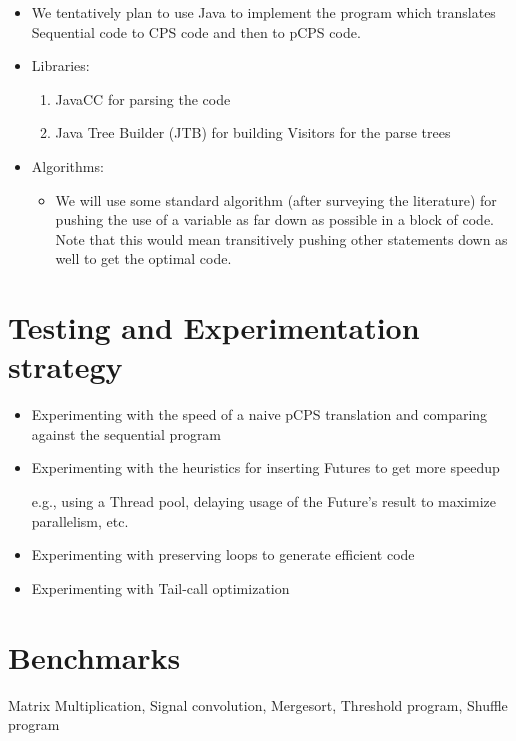 \documentclass[10pt]{article}
\begin{document}
\begin{itemize}
\item We tentatively plan to use Java to implement the program which translates Sequential code to CPS code and then to pCPS code.
\item Libraries:

\begin{enumerate}
\item JavaCC for parsing the code
\item Java Tree Builder (JTB) for building Visitors for the parse trees
\end{enumerate}

\item Algorithms:

\begin{itemize}
\item We will use some standard algorithm (after surveying the literature) for pushing the use of a variable as far down as possible in a block of code. Note that this would mean transitively pushing other statements down as well to get the optimal code.
\end{itemize}

\end{itemize}
\section*{Testing and Experimentation strategy}
\label{sec-5}

\begin{itemize}
\item Experimenting with the speed of a naive pCPS translation and comparing against the sequential program
\item Experimenting with the heuristics for inserting Futures to get more speedup
    
    e.g., using a Thread pool, delaying usage of the Future's result to maximize parallelism, etc.
\item Experimenting with preserving loops to generate efficient code
\item Experimenting with Tail-call optimization
\end{itemize}
\section*{Benchmarks}
\label{sec-6}

  Matrix Multiplication, Signal convolution, Mergesort, Threshold program, Shuffle program
\end{document}
